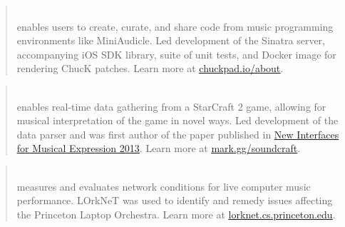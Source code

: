 

\begin{cvparagraph}


\begin{quote}
\\\leading{13pt} 
\thinspace enables users to create, curate, and share code from music programming environments like MiniAudicle. 
Led development of the Sinatra server, accompanying iOS SDK library, suite of unit tests, and Docker image for rendering ChucK patches. 
Learn more at \href{chuckpad.io/about}{\underline{chuckpad.io/about}}.
\end{quote}

\begin{quote}
\\\leading{13pt}
\thinspace enables real-time data gathering from a StarCraft 2 game, allowing for musical interpretation of the game in novel ways. 
Led development of the data parser and was first author of the paper published in \href{http://www.nime.org/proceedings/2013/nime2013_146.pdf}{\underline{New Interfaces for Musical Expression 2013}}. 
Learn more at \href{mark.gg/soundcraft}{\underline{mark.gg/soundcraft}}.
\end{quote}

\begin{quote}
\\\leading{13pt}
\thinspace measures and evaluates network conditions for live computer music performance. 
LOrkNeT was used to identify and remedy issues affecting the Princeton Laptop Orchestra. 
Learn more at \href{lorknet.cs.princeton.edu}{\underline{lorknet.cs.princeton.edu}}.
\end{quote}

\end{cvparagraph}
